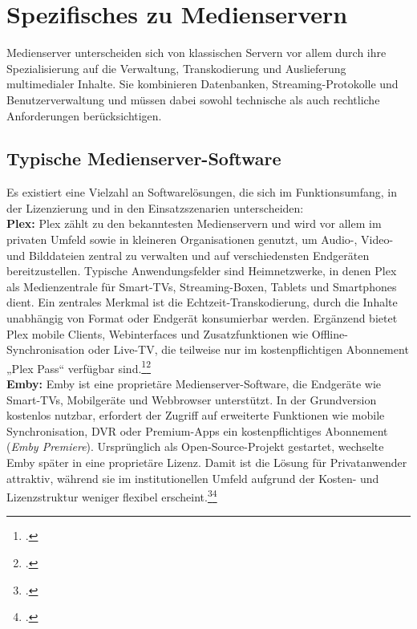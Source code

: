 \documentclass[12pt,a4paper]{report}
\begin{document}
\section{Spezifisches zu Medienservern}  
Medienserver unterscheiden sich von klassischen Servern vor allem durch ihre Spezialisierung auf die Verwaltung, Transkodierung und Auslieferung multimedialer Inhalte.  
Sie kombinieren Datenbanken, Streaming-Protokolle und Benutzerverwaltung und müssen dabei sowohl technische als auch rechtliche Anforderungen berücksichtigen.  
  
  \subsection{Typische Medienserver-Software}  
  Es existiert eine Vielzahl an Softwarelösungen, die sich im Funktionsumfang, in der Lizenzierung und in den Einsatzszenarien unterscheiden:  
  \\
  \newline 
  \textbf{Plex:}
  Plex zählt zu den bekanntesten Medienservern und wird vor allem im privaten Umfeld sowie in kleineren Organisationen genutzt, 
  um Audio-, Video- und Bilddateien zentral zu verwalten und auf verschiedensten Endgeräten bereitzustellen. 
  Typische Anwendungsfelder sind Heimnetzwerke, in denen Plex als Medienzentrale für Smart-TVs, Streaming-Boxen, Tablets und Smartphones dient. 
  Ein zentrales Merkmal ist die Echtzeit-Transkodierung, durch die Inhalte unabhängig von Format oder Endgerät konsumierbar werden. 
  Ergänzend bietet Plex mobile Clients, Webinterfaces und Zusatzfunktionen wie Offline-Synchronisation oder Live-TV, 
  die teilweise nur im kostenpflichtigen Abonnement „Plex Pass“ verfügbar sind.\footcite[Vgl.][Abschnitt „Plex Media Server“]{wikipedia_plex}\footcite[Vgl.][]{plex_docs}
  \\
  \newline
  \textbf{Emby:}
  Emby ist eine proprietäre Medienserver-Software, die Endgeräte wie Smart-TVs, Mobilgeräte und Webbrowser unterstützt. 
  In der Grundversion kostenlos nutzbar, erfordert der Zugriff auf erweiterte Funktionen wie mobile Synchronisation, 
  DVR oder Premium-Apps ein kostenpflichtiges Abonnement (\emph{Emby Premiere}). 
  Ursprünglich als Open-Source-Projekt gestartet, wechselte Emby später in eine proprietäre Lizenz. 
  Damit ist die Lösung für Privatanwender attraktiv, während sie im institutionellen Umfeld aufgrund der Kosten- 
  und Lizenzstruktur weniger flexibel erscheint.\footcite[Vgl.][]{wikipedia_emby}\footcite[Vgl.][]{emby_docs}
\end{document}
